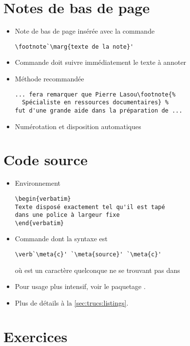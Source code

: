 \section{Notes de bas de page}

\begin{itemize}
\item Note de bas de page insérée avec la commande
\begin{lstlisting}
\footnote`\marg{texte de la note}'
\end{lstlisting}
\item Commande doit suivre immédiatement le texte à annoter
\item Méthode recommandée
\begin{lstlisting}[emph=footnote]
... fera remarquer que Pierre Lasou\footnote{%
  Spécialiste en ressources documentaires} %
fut d'une grande aide dans la préparation de ...
\end{lstlisting}
\item Numérotation et disposition automatiques
\end{itemize}


\section{Code source}

\begin{itemize}
\item Environnement 
\begin{lstlisting}
\begin{verbatim}
Texte disposé exactement tel qu'il est tapé
dans une police à largeur fixe
\end{verbatim}
\end{lstlisting}
\item Commande \cmd{\verb} dont la syntaxe est
\begin{lstlisting}
\verb`\meta{c}' `\meta{source}' `\meta{c}'
\end{lstlisting}
  où  est un caractère quelconque ne se trouvant pas dans
\item Pour usage plus intensif, voir le paquetage .
\item Plus de détails à la \autoref{sec:trucs:listings}.
\end{itemize}





\section{Exercices}
\label{sec:apparence:exercices}

